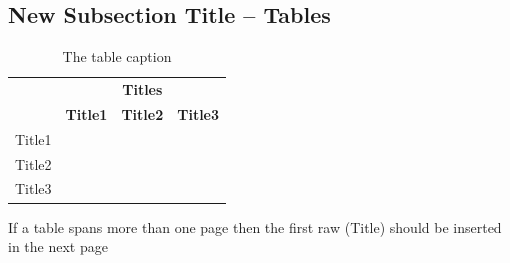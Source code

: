 \subsection{New Subsection Title – Tables}
\begin{justify}





\renewcommand{\arraystretch}{1.5}
\begin{table}[H]
\centering
\caption{The table caption}
\begin{tabular}{|p{2.25cm}|p{1.75cm}|p{1.75cm}|p{7.75cm}|}
\hline
\rowcolor[rgb]{0.914,0.914,0.914} \multicolumn{1}{|c|}{{\cellcolor[rgb]{0.914,0.914,0.914}}}                                   & \multicolumn{3}{c|}{\textbf{Titles}}                                      \\
\hhline{|>{\arrayrulecolor[rgb]{0.914,0.914,0.914}}->{\arrayrulecolor{black}}---|}
\rowcolor[rgb]{0.914,0.914,0.914} \multicolumn{1}{|c|}{\multirow{-2}{*}{{\cellcolor[rgb]{0.914,0.914,0.914}}\textbf{Heading}}} & \textbf{Title1} & \textbf{Title2} & \textbf{Title3}                       \\
\hline
{\cellcolor[rgb]{0.914,0.914,0.914}}Title1                                                                                     &                 &                 & {\cellcolor[rgb]{0.965,0.965,0.965}}  \\
\hline
{\cellcolor[rgb]{0.914,0.914,0.914}}Title2                                                                                     &                 &                 &                                       \\
\hline
{\cellcolor[rgb]{0.914,0.914,0.914}}Title3                                                                                     &                 &                 &                                       \\
\hline
\end{tabular}
\end{table}


    If a table spans more than one page then the first raw (Title) should be inserted in the next page

\end{justify}

